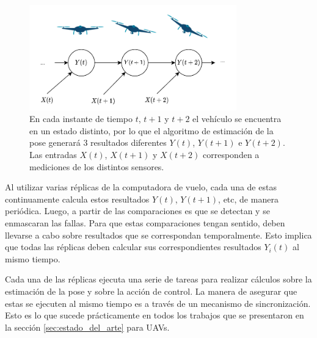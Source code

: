 
\begin{figure}[htb]
    \centering
    \includegraphics[width=0.8\textwidth]{img/evolucion_estados_real_time.png}
    \caption{En cada instante de tiempo $t$, $t+1$ y $t+2$ el vehículo se encuentra en un estado distinto, por lo que el algoritmo de estimación de la pose generará 3 resultados diferentes $Y(t)$, $Y(t+1)$ e $Y(t+2)$. Las entradas $X(t)$, $X(t+1)$ y $X(t+2)$ corresponden a mediciones de los distintos sensores.}
    \label{fig:evolucion_estados_real_time}
\end{figure}

Al utilizar varias réplicas de la computadora de vuelo, cada una de estas continuamente calcula estos resultados $Y(t)$, $Y(t+1)$, etc, de manera periódica. Luego, a partir de las comparaciones es que se detectan y se enmascaran las fallas. Para que estas comparaciones tengan sentido, deben llevarse a cabo sobre resultados que se correspondan temporalmente. Esto implica que todas las réplicas deben calcular sus correspondientes resultados $Y_i(t)$ al mismo tiempo.

Cada una de las réplicas ejecuta una serie de tareas para realizar cálculos sobre la estimación de la pose y sobre la acción de control. La manera de asegurar que estas se ejecuten al mismo tiempo es a través de un mecanismo de sincronización. Esto es lo que sucede prácticamente en todos los trabajos que se presentaron en la sección \ref{sec:estado_del_arte} para UAVs.

